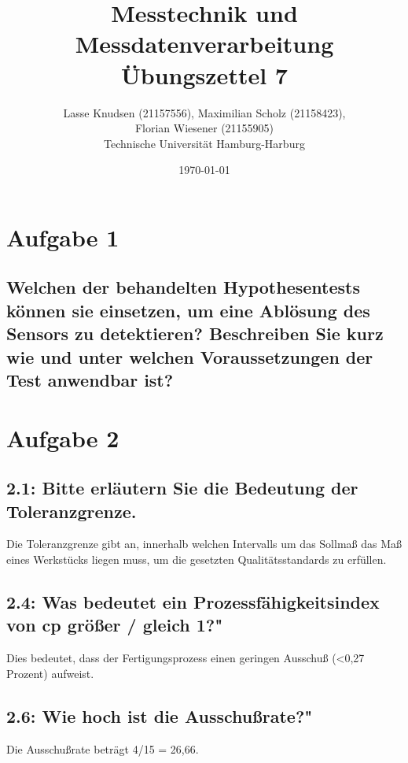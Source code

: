 \documentclass[12pt, a4paper, titlepage]{article}
\title{Messtechnik und Messdatenverarbeitung \\ \"Ubungszettel 7}
\author{Lasse Knudsen (21157556), Maximilian Scholz (21158423), \\
	Florian Wiesener (21155905)  \\
	Technische Universit\"at Hamburg-Harburg \\
}
\date{\today}
\begin{document}
	\maketitle
	 \section{Aufgabe 1}
	 \label{sec:a1}
	 \subsection{Welchen der behandelten Hypothesentests k\"onnen sie einsetzen, um eine Abl\"osung des Sensors zu
	 	detektieren? Beschreiben Sie kurz wie und unter welchen Voraussetzungen der Test anwendbar ist?}
	
	\section{Aufgabe 2}

	\subsection{2.1: Bitte erl\"autern Sie die Bedeutung der Toleranzgrenze.}
	Die Toleranzgrenze gibt an, innerhalb welchen Intervalls um das Sollmaß das Maß eines Werkstücks liegen muss,
	um die gesetzten Qualitätsstandards zu erfüllen.

	\subsection{2.4: Was bedeutet ein Prozessf\"ahigkeitsindex von cp größer / gleich 1?"}
	Dies bedeutet, dass der Fertigungsprozess einen geringen Ausschuß (<0,27 Prozent) aufweist.

	\subsection{2.6: Wie hoch ist die Ausschußrate?"}
	Die Ausschußrate beträgt 4/15 = 26,66.
	
\end{document}
